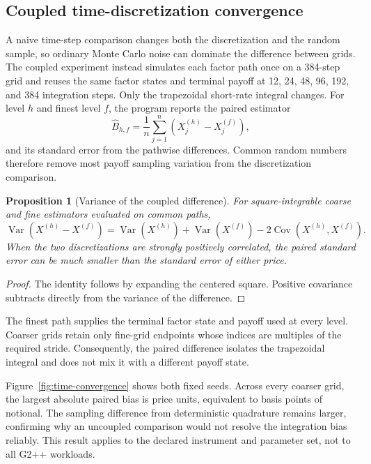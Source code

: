 \documentclass[11pt]{article}
\numberwithin{equation}{section}
\newtheorem{proposition}{Proposition}[section]
\theoremstyle{definition}
\theoremstyle{remark}
\begin{document}
\subsection{Coupled time-discretization convergence}

A naive time-step comparison changes both the discretization and the random
sample, so ordinary Monte Carlo noise can dominate the difference between
grids. The coupled experiment instead simulates each factor path once on a
384-step grid and reuses the same factor states and terminal payoff at
12, 24, 48, 96, 192, and 384 integration steps. Only the trapezoidal
short-rate integral changes. For level $h$ and finest level $f$, the program
reports the paired estimator
\begin{equation}
  \widehat{B}_{h,f}=\frac{1}{n}\sum_{j=1}^{n}
  \left(X_j^{(h)}-X_j^{(f)}\right),
\end{equation}
and its standard error from the pathwise differences. Common random numbers
therefore remove most payoff sampling variation from the discretization
comparison.

\begin{proposition}[Variance of the coupled difference]
For square-integrable coarse and fine estimators evaluated on common paths,
\[
  \operatorname{Var}(X^{(h)}-X^{(f)})
  =\operatorname{Var}(X^{(h)})+\operatorname{Var}(X^{(f)})
   -2\operatorname{Cov}(X^{(h)},X^{(f)}).
\]
When the two discretizations are strongly positively correlated, the paired
standard error can be much smaller than the standard error of either price.
\end{proposition}
\begin{proof}
The identity follows by expanding the centered square. Positive covariance
subtracts directly from the variance of the difference.
\end{proof}

The finest path supplies the terminal factor state and payoff used at every
level. Coarser grids retain only fine-grid endpoints whose indices are multiples
of the required stride. Consequently, the paired difference isolates the
trapezoidal integral and does not mix it with a different payoff state.

Figure~\ref{fig:time-convergence} shows both fixed seeds. Across every coarser
grid, the largest absolute paired bias is \TimeMaxPairedBias{} price units,
equivalent to \TimeMaxPairedBiasBp{} basis points of notional. The sampling
difference from deterministic quadrature remains larger, confirming why an
uncoupled comparison would not resolve the integration bias reliably. This
result applies to the declared instrument and parameter set, not to all G2++
workloads.
\end{document}
